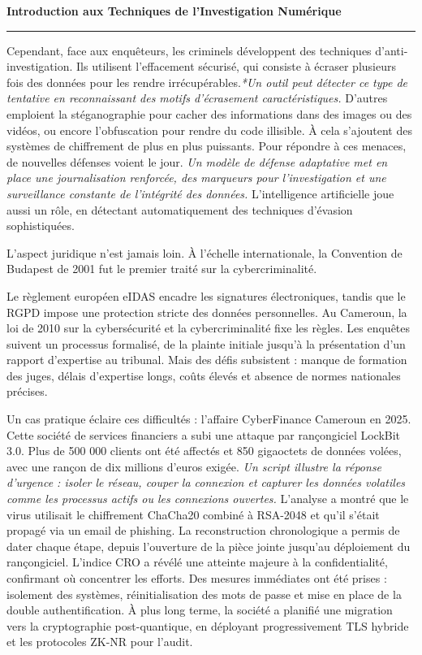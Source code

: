 \documentclass[12pt,a4paper]{article}
\newcommand{\HRule}{\rule{\linewidth}{1pt}}
\begin{document}
	\newpage 
	
	\begin{flushright}
		\textbf{Introduction aux Techniques de l'Investigation Numérique}
		\HRule
	\end{flushright}
	
	\vspace{0.5cm}
	
	\medskip
	\noindent
	Cependant, face aux enquêteurs, les criminels développent des techniques d’anti-investigation. Ils utilisent l’effacement sécurisé, qui consiste à écraser plusieurs fois des données pour les rendre irrécupérables.\textit{*Un outil peut détecter ce type de tentative en reconnaissant des motifs d’écrasement caractéristiques.} D’autres emploient la stéganographie pour cacher des informations dans des images ou des vidéos, ou encore l’obfuscation pour rendre du code illisible. À cela s’ajoutent des systèmes de chiffrement de plus en plus puissants. Pour répondre à ces menaces, de nouvelles défenses voient le jour. \textit{Un modèle de défense adaptative met en place une journalisation renforcée, des marqueurs pour l’investigation et une surveillance constante de l’intégrité des données.} L’intelligence artificielle joue aussi un rôle, en détectant automatiquement des techniques d’évasion sophistiquées.
	
	\medskip
	\noindent
	L’aspect juridique n’est jamais loin. À l’échelle internationale, la Convention de Budapest de 2001 fut le premier traité sur la cybercriminalité. 
	
	\noindent
	Le règlement européen eIDAS encadre les signatures électroniques, tandis que le RGPD impose une protection stricte des données personnelles. Au Cameroun, la loi de 2010 sur la cybersécurité et la cybercriminalité fixe les règles. Les enquêtes suivent un processus formalisé, de la plainte initiale jusqu’à la présentation d’un rapport d’expertise au tribunal. Mais des défis subsistent : manque de formation des juges, délais d’expertise longs, coûts élevés et absence de normes nationales précises.
	
	\medskip
	\noindent
	Un cas pratique éclaire ces difficultés : l’affaire CyberFinance Cameroun en 2025. Cette société de services financiers a subi une attaque par rançongiciel LockBit 3.0. Plus de 500 000 clients ont été affectés et 850 gigaoctets de données volées, avec une rançon de dix millions d’euros exigée. \textit{Un script illustre la réponse d’urgence : isoler le réseau, couper la connexion et capturer les données volatiles comme les processus actifs ou les connexions ouvertes.} L’analyse a montré que le virus utilisait le chiffrement ChaCha20 combiné à RSA-2048 et qu’il s’était propagé via un email de phishing. La reconstruction chronologique a permis de dater chaque étape, depuis l’ouverture de la pièce jointe jusqu’au déploiement du rançongiciel. L’indice CRO a révélé une atteinte majeure à la confidentialité, confirmant où concentrer les efforts. Des mesures immédiates ont été prises : isolement des systèmes, réinitialisation des mots de passe et mise en place de la double authentification. À plus long terme, la société a planifié une migration vers la cryptographie post-quantique, en déployant progressivement TLS hybride et les protocoles ZK-NR pour l’audit.
	
\end{document}
